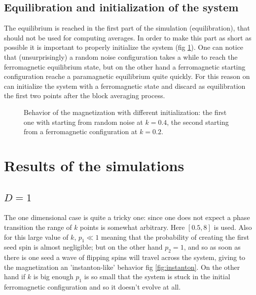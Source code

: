 \documentclass[a4paper, 11pt]{article}
\begin{document}
    \subsection{Equilibration and initialization of the system}
      The equilibrium is reached in the first part of the simulation (equilibration), that should not be used for computing averages. In order to make this part as short as possible it is important to properly initialize the system (fig \ref{fig:equilibration}). One can notice that (unsurprisingly) a random noise configuration takes a while to reach the ferromagnetic equilibrium state, but on the other hand a ferromagnetic starting configuration reache a paramagnetic equilibrium quite quickly.
      For this reason on can initialize the system with a ferromagnetic state and discard as equilibration the first two points after the block averaging process.

      \begin{figure}[H]
        \centering
         \quad
        \caption{Behavior of the magnetization with different initialization: the first one with starting from random noise at $k = 0.4$, the second starting from a ferromagnetic configuration at $k = 0.2$.}
        \label{fig:equilibration}
      \end{figure}


  \section{Results of the simulations}
    \subsection{$D = 1$}
      The one dimensional case is quite a tricky one: since one does not expect a phase transition the range of $k$ points is somewhat arbitrary. Here $[0.5,8]$ is used. Also for this large value of $k$, $p_1 \ll 1$ meaning that the probability of creating the first seed spin is almost negligible; but on the other hand $p_2 = 1$, and so as soon as there is one seed a wave of flipping spins will travel across the system, giving to the magnetization an 'instanton-like' behavior fig \ref{fig:instanton}. On the other hand if $k$ is big enough $p_1$ is so small that the system is stuck in the initial ferromagnetic configuration and so it doesn't evolve at all.
\end{document}
